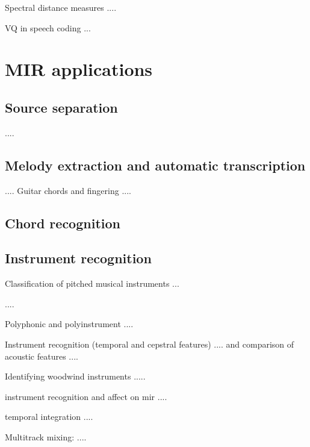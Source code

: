 \documentclass[journal]{IEEEtran}
\begin{document}
Spectral distance measures \cite{viswanathan1976spectralDistance}....

VQ in speech coding \cite{gersho1992vq}...

\section{MIR applications}
\subsection{Source separation}
\cite{slaney1994soundSeparation}....
\subsection{Melody extraction and automatic transcription}

\cite{benetos2013automatic,ohanlon2013automatic,peeters2006music}....
Guitar chords and fingering \cite{barbancho2012automatic}....
\subsection{Chord recognition}
\subsection{Instrument recognition}
Classification of pitched musical instruments \cite{herrera2006automatic}...

\cite{martin1998musical,yu2014sparse}....

Polyphonic and polyinstrument \cite{hamel2009automatic}....

Instrument recognition (temporal and cepstral features) \cite{eronen2000musical}.... and comparison of acoustic features \cite{eronen2001comparison}....

Identifying woodwind instruments \cite{brown2001feature}.....

instrument recognition and affect on mir \cite{kitahara2007computational}....

temporal integration \cite{Joder:09}....

Multitrack mixing: \cite{scottinstrument,scott2011automatic}....
\end{document}

